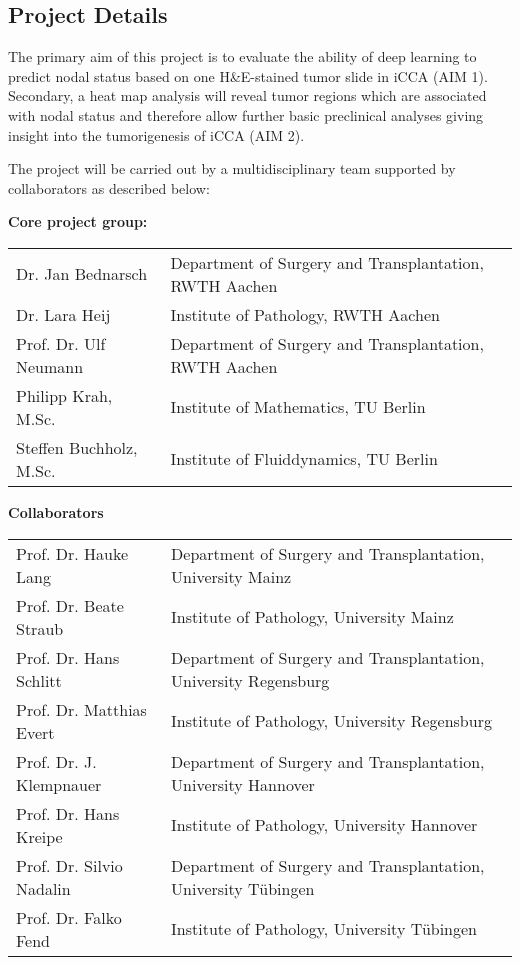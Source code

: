 \documentclass[12pt]{article}
\begin{document}
\subsection{Project Details}
The primary aim of this project is to evaluate the ability of deep learning to predict nodal status based on one H\&E-stained tumor slide in iCCA (AIM 1). Secondary, a heat map analysis will reveal tumor regions which are associated with nodal status and therefore allow further basic preclinical analyses giving insight into the tumorigenesis of iCCA (AIM 2).

The project will be carried out by a multidisciplinary team supported by collaborators as described below:

\textbf{Core project group:}
\begin{table}[H]
	\footnotesize
  \begin{center}
    \begin{tabular}{p{4cm} p{11cm}}
			Dr. Jan Bednarsch	&	Department of Surgery and Transplantation, RWTH Aachen\\
			Dr. Lara Heij			&		Institute of Pathology, RWTH Aachen\\
			Prof. Dr. Ulf Neumann&	Department of Surgery and Transplantation, RWTH Aachen\\
			Philipp Krah, M.Sc.	&		Institute of Mathematics, TU Berlin\\
			Steffen Buchholz, M.Sc.	&	Institute of Fluiddynamics, TU Berlin\\
\end{tabular}
\end{center}
\end{table}


\textbf{Collaborators}
\begin{table}[H]
	\footnotesize
  \begin{center}
    \begin{tabular}{p{4cm} p{11cm}}
			Prof. Dr. Hauke Lang			&Department of Surgery and Transplantation, University Mainz\\
			Prof. Dr. Beate Straub 		&Institute of Pathology, University Mainz \\
			Prof. Dr. Hans Schlitt		&Department of Surgery and Transplantation, University Regensburg\\
			Prof. Dr. Matthias Evert	&Institute of Pathology, University Regensburg\\
			Prof. Dr. J. Klempnauer		&Department of Surgery and Transplantation, University Hannover\\
			Prof. Dr. Hans Kreipe			&Institute of Pathology, University Hannover\\
			Prof. Dr. Silvio Nadalin	&Department of Surgery and Transplantation, University Tübingen\\
			Prof. Dr. Falko Fend			&Institute of Pathology, University Tübingen
    \end{tabular}
  \end{center}
\end{table}
\end{document}
